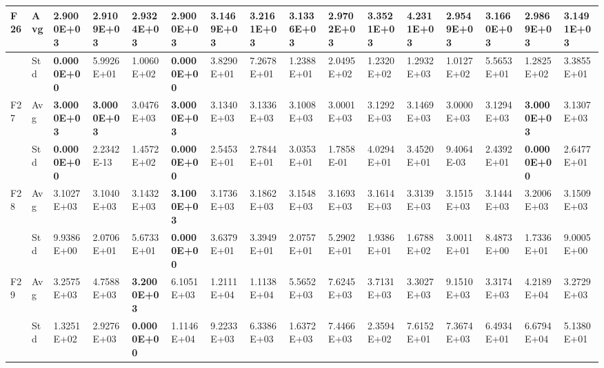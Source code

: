 \documentclass{article} %
\begin{document}
\begin{tabular}{|p{0.3in}|p{0.3in}|p{0.3in}|p{0.3in}|p{0.3in}|p{0.3in}|p{0.3in}|p{0.3in}|p{0.3in}|p{0.3in}|p{0.3in}|p{0.3in}|p{0.3in}|p{0.3in}|p{0.3in}|p{0.5in}|}
F26 & Avg & \textbf{2.9000E+03} & 2.9109E+03 & 2.9324E+03 & \textbf{2.9000E+03} & 3.1469E+03 & 3.2161E+03 & 3.1336E+03 & 2.9702E+03 & 3.3521E+03 & 4.2311E+03 & 2.9549E+03 & 3.1660E+03 & 2.9869E+03 & 3.1491E+03 \\ \hline 
 & Std & \textbf{0.0000E+00} & 5.9926E+01 & 1.0060E+02 & \textbf{0.0000E+00} & 3.8290E+01 & 7.2678E+01 & 1.2388E+01 & 2.0495E+02 & 1.2320E+02 & 1.2932E+03 & 1.0127E+02 & 5.5653E+01 & 1.2825E+02 & 3.3855E+01 \\ \hline 
F27 & Avg & \textbf{3.0000E+03} & \textbf{3.0000E+03} & 3.0476E+03 & \textbf{3.0000E+03} & 3.1340E+03 & 3.1336E+03 & 3.1008E+03 & 3.0001E+03 & 3.1292E+03 & 3.1469E+03 & 3.0000E+03 & 3.1294E+03 & \textbf{3.0000E+03} & 3.1307E+03 \\ \hline 
 & Std & \textbf{0.0000E+00} & 2.2342E-13 & 1.4572E+02 & \textbf{0.0000E+00} & 2.5453E+01 & 2.7844E+01 & 3.0353E+01 & 1.7858E-01 & 4.0294E+01 & 3.4520E+01 & 9.4064E-03 & 2.4392E+01 & \textbf{0.0000E+00} & 2.6477E+01 \\ \hline 
F28 & Avg & 3.1027E+03 & 3.1040E+03 & 3.1432E+03 & \textbf{3.1000E+03} & 3.1736E+03 & 3.1862E+03 & 3.1548E+03 & 3.1693E+03 & 3.1614E+03 & 3.3139E+03 & 3.1515E+03 & 3.1444E+03 & 3.2006E+03 & 3.1509E+03 \\ \hline 
 & Std & 9.9386E+00 & 2.0706E+01 & 5.6733E+01 & \textbf{0.0000E+00} & 3.6379E+01 & 3.3949E+01 & 2.0757E+01 & 5.2902E+01 & 1.9386E+01 & 1.6788E+02 & 3.0011E+01 & 8.4873E+00 & 1.7336E+01 & 9.0005E+00 \\ \hline 
F29 & Avg & 3.2575E+03 & 4.7588E+03 & \textbf{3.2000E+03} & 6.1051E+03 & 1.2111E+04 & 1.1138E+04 & 5.5652E+03 & 7.6245E+03 & 3.7131E+03 & 3.3027E+03 & 9.1510E+03 & 3.3174E+03 & 4.2189E+04 & 3.2729E+03 \\ \hline 
 & Std & 1.3251E+02 & 2.9276E+03 & \textbf{0.0000E+00} & 1.1146E+04 & 9.2233E+03 & 6.3386E+03 & 1.6372E+03 & 7.4466E+03 & 2.3594E+02 & 7.6152E+01 & 7.3674E+03 & 6.4934E+01 & 6.6794E+04 & 5.1380E+01 \\ \hline 
\end{tabular}
\end{document}
